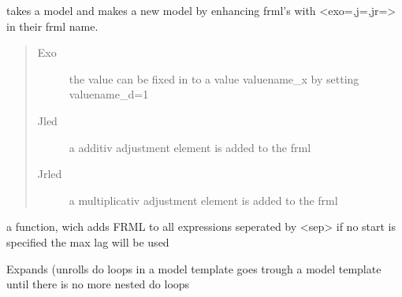 \documentclass[letterpaper,10pt,english]{sphinxmanual}
\begin{document}
\begin{fulllineitems}
\label{\detokenize{index:modelmanipulation.exounroll}}
\pysigstartsignatures
{}
\pysigstopsignatures
\sphinxAtStartPar
takes a model and makes a new model by enhancing frml’s with \textless{}exo=,j=,jr=\textgreater{}
in their frml name.
\begin{quote}\begin{description}
\item[{Exo}] \leavevmode
\sphinxAtStartPar
the value can be fixed in to a value valuename\_x by setting valuename\_d=1

\item[{Jled}] \leavevmode
\sphinxAtStartPar
a additiv adjustment element is added to the frml

\item[{Jrled}] \leavevmode
\sphinxAtStartPar
a multiplicativ adjustment element is added to the frml

\end{description}\end{quote}

\end{fulllineitems}


\begin{fulllineitems}
\label{\detokenize{index:modelmanipulation.tofrml}}
\pysigstartsignatures
{}
\pysigstopsignatures
\sphinxAtStartPar
a function, wich adds FRML to all expressions seperated by \textless{}sep\textgreater{}
if no start is specified the max lag will be used

\end{fulllineitems}


\begin{fulllineitems}
\label{\detokenize{index:modelmanipulation.dounloop}}
\pysigstartsignatures
{}
\pysigstopsignatures
\sphinxAtStartPar
Expands (unrolls  do loops in a model template
goes trough a model template until there is no more nested do loops

\end{fulllineitems}
\end{document}
